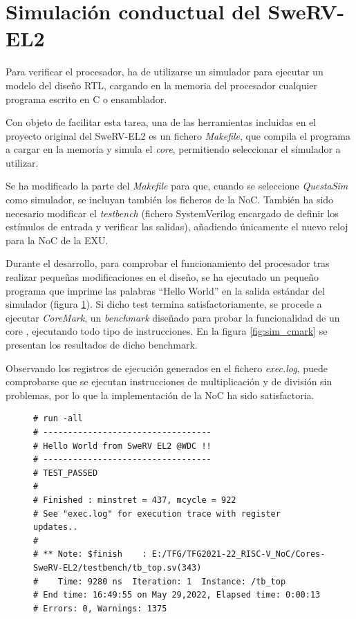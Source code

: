 \section{Simulación conductual del SweRV-EL2}
Para verificar el procesador, ha de utilizarse un simulador para ejecutar un modelo del diseño RTL, cargando en la memoria del procesador cualquier programa escrito en C o ensamblador.

Con objeto de facilitar esta tarea, una de las herramientas incluidas en el proyecto original del SweRV-EL2 es un fichero \textit{Makefile}, que compila el programa a cargar en la memoria y simula el \textit{core}, permitiendo seleccionar el simulador a utilizar.

Se ha modificado la parte del \textit{Makefile} para que, cuando se seleccione \textit{QuestaSim} como simulador, se incluyan también los ficheros de la NoC. También ha sido necesario modificar el \textit{testbench} (fichero SystemVerilog encargado de definir los estímulos de entrada y verificar las salidas), añadiendo únicamente el nuevo reloj para la NoC de la EXU.

Durante el desarrollo, para comprobar el funcionamiento del procesador tras realizar pequeñas modificaciones en el diseño, se ha ejecutado un pequeño programa que imprime las palabras ``Hello World'' en la salida estándar del simulador (figura \ref{fig:sim_hw}). Si dicho test termina satisfactoriamente, se procede a ejecutar \textit{CoreMark}, un \textit{benchmark} diseñado para probar la funcionalidad de un core \cite{EEMBCCoreMark}, ejecutando todo tipo de instrucciones. En la figura \ref{fig:sim_cmark} se presentan los resultados de dicho benchmark.

Observando los registros de ejecución generados en el fichero \textit{exec.log}, puede comprobarse que se ejecutan instrucciones de multiplicación y de división sin problemas, por lo que la implementación de la NoC ha sido satisfactoria.

\begin{figure}[hp]
    \centering
    \begin{verbatim}
# run -all
# ----------------------------------
# Hello World from SweRV EL2 @WDC !!
# ----------------------------------
# TEST_PASSED
#
# Finished : minstret = 437, mcycle = 922
# See "exec.log" for execution trace with register updates..
#
# ** Note: $finish    : E:/TFG/TFG2021-22_RISC-V_NoC/Cores-SweRV-EL2/testbench/tb_top.sv(343)
#    Time: 9280 ns  Iteration: 1  Instance: /tb_top
# End time: 16:49:55 on May 29,2022, Elapsed time: 0:00:13
# Errors: 0, Warnings: 1375
    \end{verbatim}
    \label{fig:sim_hw}
\end{figure}


